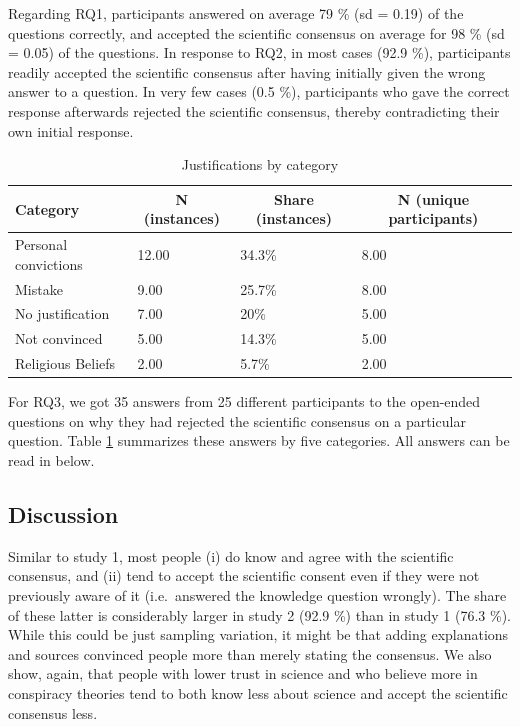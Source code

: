 \documentclass[
  doc,floatsintext]{apa6}
\begin{document}
Regarding RQ1, participants answered on average 79 \% (sd = 0.19) of the questions correctly, and accepted the scientific consensus on average for 98 \% (sd = 0.05) of the questions. In response to RQ2, in most cases (92.9 \%), participants readily accepted the scientific consensus after having initially given the wrong answer to a question. In very few cases (0.5 \%), participants who gave the correct response afterwards rejected the scientific consensus, thereby contradicting their own initial response.

\begin{table}[tbp]

\begin{center}
\begin{threeparttable}

\caption{\label{tab:exp2-justifications}Justifications by category}

\begin{tabular}{llll}
\toprule
Category & \multicolumn{1}{c}{N (instances)} & \multicolumn{1}{c}{Share (instances)} & \multicolumn{1}{c}{N (unique participants)}\\
\midrule
Personal convictions & 12.00 & 34.3\% & 8.00\\
Mistake & 9.00 & 25.7\% & 8.00\\
No justification & 7.00 & 20\% & 5.00\\
Not convinced & 5.00 & 14.3\% & 5.00\\
Religious Beliefs & 2.00 & 5.7\% & 2.00\\
\bottomrule
\end{tabular}

\end{threeparttable}
\end{center}

\end{table}

For RQ3, we got 35 answers from 25 different participants to the open-ended questions on why they had rejected the scientific consensus on a particular question. Table \ref{tab:exp2-justifications} summarizes these answers by five categories. All answers can be read in below.

\subsection{Discussion}\label{discussion-2}

Similar to study 1, most people (i) do know and agree with the scientific consensus, and (ii) tend to accept the scientific consent even if they were not previously aware of it (i.e.~answered the knowledge question wrongly). The share of these latter is considerably larger in study 2 (92.9 \%) than in study 1 (76.3 \%). While this could be just sampling variation, it might be that adding explanations and sources convinced people more than merely stating the consensus. We also show, again, that people with lower trust in science and who believe more in conspiracy theories tend to both know less about science and accept the scientific consensus less.
\end{document}
